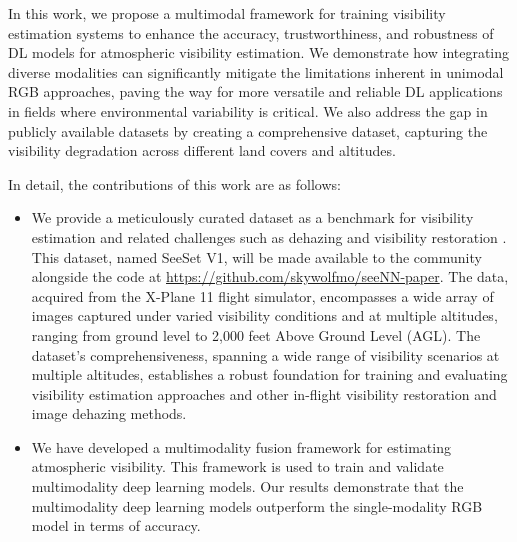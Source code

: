 In this work, we propose a multimodal framework for training visibility estimation systems to enhance the accuracy, trustworthiness, and robustness of DL models for atmospheric visibility estimation. We demonstrate how integrating diverse modalities can significantly mitigate the limitations inherent in unimodal RGB approaches, paving the way for more versatile and reliable DL applications in fields where environmental variability is critical. We also address the gap in publicly available datasets by creating a comprehensive dataset, capturing the visibility degradation across different land covers and altitudes.



In detail, the contributions of this work are as follows:
\begin{itemize}
    \item We provide a meticulously curated dataset as a benchmark for visibility estimation and related challenges such as dehazing and visibility restoration \cite{gui2023comprehensive}. This dataset, named SeeSet V1, will be made available to the community alongside the code at \url{https://github.com/skywolfmo/seeNN-paper}. The data, acquired from the X-Plane 11 flight simulator, encompasses a wide array of images captured under varied visibility conditions and at multiple altitudes, ranging from ground level to 2,000 feet Above Ground Level (AGL).  
    The dataset's comprehensiveness, spanning a wide range of visibility scenarios at multiple altitudes, establishes a robust foundation for training and evaluating visibility estimation approaches and other in-flight visibility restoration and image dehazing methods.
    
    \item  We have developed a multimodality fusion framework for estimating atmospheric visibility. This framework is used to train and validate multimodality deep learning models. Our results demonstrate that the multimodality deep learning models outperform the single-modality RGB model in terms of accuracy.


\end{itemize}

